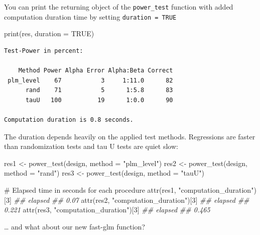 \documentclass[
  letterpaper,
  DIV=11,
  numbers=noendperiod]{scrreprt}
\newenvironment{Shaded}{\begin{snugshade}}{\end{snugshade}}
\newcommand{\AttributeTok}[1]{\textcolor[rgb]{0.40,0.45,0.13}{#1}}
\newcommand{\CommentTok}[1]{\textcolor[rgb]{0.37,0.37,0.37}{#1}}
\newcommand{\ConstantTok}[1]{\textcolor[rgb]{0.56,0.35,0.01}{#1}}
\newcommand{\DecValTok}[1]{\textcolor[rgb]{0.68,0.00,0.00}{#1}}
\newcommand{\DocumentationTok}[1]{\textcolor[rgb]{0.37,0.37,0.37}{\textit{#1}}}
\newcommand{\FunctionTok}[1]{\textcolor[rgb]{0.28,0.35,0.67}{#1}}
\newcommand{\NormalTok}[1]{\textcolor[rgb]{0.00,0.23,0.31}{#1}}
\newcommand{\OtherTok}[1]{\textcolor[rgb]{0.00,0.23,0.31}{#1}}
\newcommand{\StringTok}[1]{\textcolor[rgb]{0.13,0.47,0.30}{#1}}
\begin{document}
You can print the returning object of the \texttt{power\_test} function
with added computation duration time by setting
\texttt{duration\ =\ TRUE}

\begin{Shaded}
\begin{Highlighting}[]
\FunctionTok{print}\NormalTok{(res, }\AttributeTok{duration =} \ConstantTok{TRUE}\NormalTok{)}
\end{Highlighting}
\end{Shaded}

\begin{verbatim}
Test-Power in percent:

    Method Power Alpha Error Alpha:Beta Correct
 plm_level    67           3     1:11.0      82
      rand    71           5      1:5.8      83
      tauU   100          19      1:0.0      90

Computation duration is 0.8 seconds.
\end{verbatim}

The duration depends heavily on the applied test methods. Regressions
are faster than randomization tests and tau U tests are quiet slow:

\begin{Shaded}
\begin{Highlighting}[]
\NormalTok{res1 }\OtherTok{\textless{}{-}} \FunctionTok{power\_test}\NormalTok{(design, }\AttributeTok{method =} \StringTok{"plm\_level"}\NormalTok{)}
\NormalTok{res2 }\OtherTok{\textless{}{-}} \FunctionTok{power\_test}\NormalTok{(design, }\AttributeTok{method =} \StringTok{"rand"}\NormalTok{)}
\NormalTok{res3 }\OtherTok{\textless{}{-}} \FunctionTok{power\_test}\NormalTok{(design, }\AttributeTok{method =} \StringTok{"tauU"}\NormalTok{)}

\CommentTok{\# Elapsed time in seconds for each procedure}
\FunctionTok{attr}\NormalTok{(res1, }\StringTok{"computation\_duration"}\NormalTok{)[}\DecValTok{3}\NormalTok{]}
\DocumentationTok{\#\# elapsed }
\DocumentationTok{\#\#    0.07}
\FunctionTok{attr}\NormalTok{(res2, }\StringTok{"computation\_duration"}\NormalTok{)[}\DecValTok{3}\NormalTok{]}
\DocumentationTok{\#\# elapsed }
\DocumentationTok{\#\#   0.221}
\FunctionTok{attr}\NormalTok{(res3, }\StringTok{"computation\_duration"}\NormalTok{)[}\DecValTok{3}\NormalTok{]}
\DocumentationTok{\#\# elapsed }
\DocumentationTok{\#\#   0.465}
\end{Highlighting}
\end{Shaded}

\ldots{} and what about our new fast-glm function?
\end{document}
